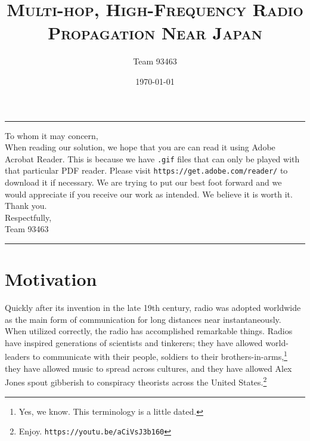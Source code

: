 \documentclass[11pt]{article}
\title{
    \textsc{{Multi-hop, High-Frequency Radio Propagation Near Japan}}
    }
\author{\Large Team 93463}
\date{\today}
\numberwithin{equation}{section}
\begin{document}
    \singlespacing %
    \clearpage
    \maketitle
    \thispagestyle{empty} %

    \begin{center}
        \rule{13cm}{0.4pt}  
    \end{center}

    \noindent To whom it may concern, \vspace{4pt}\\
    \indent When reading our solution, we hope that you are can read it using Adobe Acrobat Reader. This is because we have \texttt{.gif} files that can only be played with that particular PDF reader. Please visit \texttt{https://get.adobe.com/reader/} to download it if necessary. We are trying to put our best foot forward and we would appreciate if you receive our work as intended. We believe it is worth it. Thank you.
    \vspace{4pt} \\ 
    Respectfully,\vspace{3pt}\\
    \indent Team 93463
    \begin{center}
        \rule{13cm}{0.4pt}  
    \end{center}

\newpage

\setcounter{page}{1} %

\section{Motivation} %
\label{sec:motivation}

Quickly after its invention in the late 19th century, radio was adopted worldwide as the main form of communication for long distances near instantaneously.\cite{hilmes2002radio} When utilized correctly, the radio has accomplished remarkable things. Radios have inspired generations of scientists and tinkerers; they have allowed world-leaders to communicate with their people, soldiers to their brothers-in-arms,\footnote{Yes, we know. This terminology is a little dated.} they have allowed music to spread across cultures, and they have allowed Alex Jones spout gibberish to conspiracy theorists across the United States.\footnote{Enjoy. \texttt{https://youtu.be/aCiVsJ3b160}} 
\end{document}

